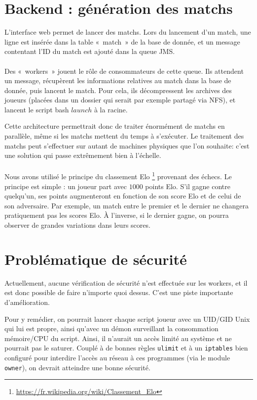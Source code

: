 \documentclass[10pt]{scrartcl}
\begin{document}
\section{Backend : génération des matchs}
  L'interface web permet de lancer des matchs. Lors du lancement d'un
  match, une ligne est insérée dans la table «~match~» de la base de
  donnée, et un message contentant l'ID du match est ajouté dans la
  queue JMS.

  \paragraph{}
  Des «~workers~» jouent le rôle de consommateurs de cette queue. Ils
  attendent un message, récupèrent les informations relatives au match
  dans la base de donnée, puis lancent le match. Pour cela, ils décompressent
  les archives des joueurs (placées dans un dossier qui serait par exemple partagé
  via NFS), et lancent le script bash $launch$ à la racine.

  Cette architecture permettrait donc de traiter énormément de matchs en parallèle,
  même si les matchs mettent du temps à s'exécuter. Le traitement des matchs peut
  s'effectuer sur autant de machines physiques que l'on souhaite: c'est une solution
  qui passe extrêmement bien à l'échelle.

  \paragraph{}
  Nous avons utilisé le principe du classement Elo
  \footnote{\url{https://fr.wikipedia.org/wiki/Classement\_Elo}} provenant
  des échecs. Le principe est simple : un joueur part avec $1000$ points Elo.
  S'il gagne contre quelqu'un, ses points augmenteront en fonction de son
  score Elo et de celui de son adversaire. Par exemple, un match entre le
  premier et le dernier ne changera pratiquement pas les scores Elo. À l'inverse,
  si le dernier gagne, on pourra observer de grandes variations dans leurs scores.

\section{Problématique de sécurité}
  Actuellement, aucune vérification de sécurité n'est effectuée sur les workers, et
  il est donc possible de faire n'importe quoi dessus.
  C'est une piste importante d'amélioration.

  Pour y remédier, on pourrait lancer chaque script joueur avec un UID/GID Unix qui lui est propre,
  ainsi qu'avec un démon surveillant la consommation mémoire/CPU du script. Ainsi, il n'aurait un accès
  limité au système et ne pourrait pas le saturer. Couplé à de bonnes règles \verb+ulimit+ et à un \verb+iptables+ bien
  configuré pour interdire l'accès au réseau à ces programmes (via le module \verb+owner+), on devrait atteindre une
  bonne sécurité.
\end{document}
